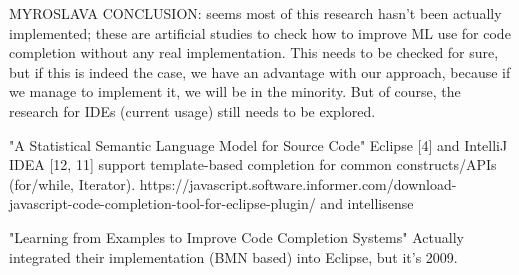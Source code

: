 MYROSLAVA CONCLUSION: seems most of this research hasn't been actually implemented; these are artificial studies to check how to improve ML use for code completion without any real implementation. This needs to be checked for sure, but if this is indeed the case, we have an advantage with our approach, because if we manage to implement it, we will be in the minority. But of course, the research for IDEs (current usage) still needs to be explored.

"A Statistical Semantic Language Model for Source Code"
Eclipse [4] and IntelliJ IDEA [12, 11] support template-based completion for common constructs/APIs (for/while, Iterator).
https://javascript.software.informer.com/download-javascript-code-completion-tool-for-eclipse-plugin/
and intellisense

"Learning from Examples to Improve Code Completion Systems"
Actually integrated their implementation (BMN based) into Eclipse, but it's 2009.